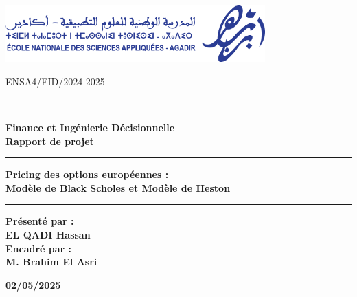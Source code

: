 \documentclass[a4paper,12pt]{report}
\begin{document}
\begin{titlepage}
    \centering
    \includegraphics[width=10cm]{LogoIbnZohr.png}
\\[0.4cm]

\begin{minipage}{5cm}
	
\end{minipage}\hfill
\begin{minipage}{10cm}
	\begin{flushright}
	{\small ENSA4/FID/2024-2025}\\[0.1cm]
	\end{flushright}
\end{minipage}\hfill\\
\vspace{22mm}


{\large \bfseries Finance et Ingénierie Décisionnelle}\\[0.5cm]





\vspace{15mm}
{\LARGE \bfseries Rapport de projet}\\[0.75cm]
\vspace{0.5cm}
\noindent\rule[7pt]{\linewidth}{0.6pt}
\textbf{{ \LARGE \bfseries Pricing des options européennes :\\[0.4cm]Modèle de Black Scholes et Modèle de Heston\\[0.4cm]}}
\noindent\rule[7pt]{\linewidth}{0.6pt}

\vspace{25mm}


{\normalsize \bfseries Présenté par :}\\[0.25cm]
{\large \bfseries \textbf{EL QADI Hassan}}\\[1cm]


{\normalsize \bfseries Encadré par :}\\[0.25cm]
{\large \bfseries \textbf{M. Brahim El Asri}}\\[1cm]


\vspace{25mm}


\begin{center}
\textbf{02/05/2025}
\end{center}


\end{titlepage}
\end{document}
